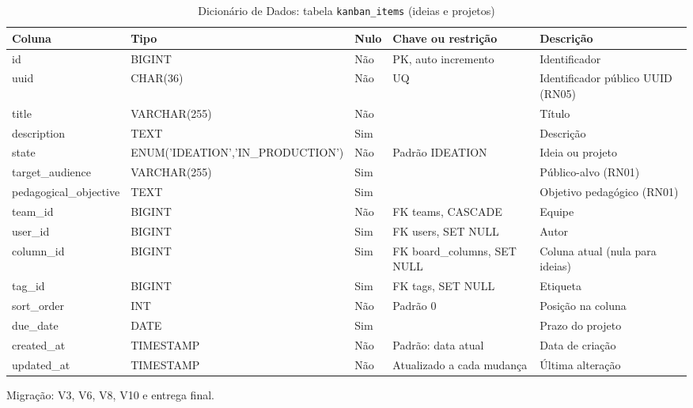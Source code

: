 \begin{table}[H]
\centering
\footnotesize
\caption{Dicionário de Dados: tabela \texttt{kanban\_\allowbreak{}items} (ideias e projetos)}
\label{tab:dd-kanban-items}
\begin{tabular}{|>{\raggedright\arraybackslash}p{3.0cm}|>{\raggedright\arraybackslash}p{3.2cm}|>{\centering\arraybackslash}p{0.8cm}|>{\raggedright\arraybackslash}p{3.0cm}|>{\raggedright\arraybackslash}p{3.8cm}|}
\hline
\textbf{Coluna} & \textbf{Tipo} & \textbf{Nulo} & \textbf{Chave ou restrição} & \textbf{Descrição} \\
\hline
id & BIGINT & Não & PK, auto incremento & Identificador \\
\hline
uuid & CHAR(36) & Não & UQ & Identificador público UUID (RN05) \\
\hline
title & VARCHAR(255) & Não &  & Título \\
\hline
description & TEXT & Sim &  & Descrição \\
\hline
state & ENUM('IDEATION',\allowbreak 'IN\_\allowbreak{}PRODUCTION') & Não & Padrão IDEATION & Ideia ou projeto \\
\hline
target\_\allowbreak{}audience & VARCHAR(255) & Sim &  & Público-alvo (RN01) \\
\hline
pedagogical\_\allowbreak{}objective & TEXT & Sim &  & Objetivo pedagógico (RN01) \\
\hline
team\_\allowbreak{}id & BIGINT & Não & FK teams, CASCADE & Equipe \\
\hline
user\_\allowbreak{}id & BIGINT & Sim & FK users, SET NULL & Autor \\
\hline
column\_\allowbreak{}id & BIGINT & Sim & FK board\_\allowbreak{}columns, SET NULL & Coluna atual (nula para ideias) \\
\hline
tag\_\allowbreak{}id & BIGINT & Sim & FK tags, SET NULL & Etiqueta \\
\hline
sort\_\allowbreak{}order & INT & Não & Padrão 0 & Posição na coluna \\
\hline
due\_\allowbreak{}date & DATE & Sim &  & Prazo do projeto \\
\hline
created\_\allowbreak{}at & TIMESTAMP & Não & Padrão: data atual & Data de criação \\
\hline
updated\_\allowbreak{}at & TIMESTAMP & Não & Atualizado a cada mudança & Última alteração \\
\hline
\end{tabular}
\par\footnotesize Migração: V3, V6, V8, V10 e entrega final.
\end{table}

